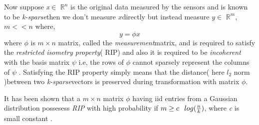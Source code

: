 \documentclass[12pt]{article}
\theoremstyle{definition}
\newtheorem{defn}{Definition}[section]
\def\ksparse{\textit{k-sparse}\hspace{0.1in}}
\def\measurement{\textit{measurement}\hspace{0.1in}}
\def\x{$x$\hspace{0.1in}}
\def\y{$y$\hspace{0.1in}}
\begin{document}
\par Now suppose \textit{x}$\in$ $\mathbb{R}^n$ is the original data measured by the sensors and 
is known to be \ksparse then we don't measure \x directly but instead measure \y$\in$ $\mathbb{R}^m$, $m << n$ where,
\begin{equation}
 y = \phi x
\end{equation}
where $\phi$ is $m\times n$ matrix, called the \measurement matrix, and is required to satisfy the \textit{restricted
isometry property}( RIP) \cite{Needell-CoSaMP}
and also it is required to be \textit{incoherent} with the basis matrix $\psi$ 
i.e, the rows of $\phi$ cannot sparsely represent the columns of $\psi$ \cite{Baraniuk-CS}.
  Satisfying the RIP property simply means that the distance( here $l_2$ norm )between two \ksparse vectors is preserved
  during transformation with matrix $\phi$.
  
 \par It has been shown that a $m \times n$ matrix $\phi$ having iid entries from a Gaussian distribution
  possesess \textit{RIP} with high probability if $m \geq c\hspace{0.1in}log(\frac{n}{k})$, 
 where \textit{c} is small constant \cite{Baraniuk-CS}.
\end{document}
